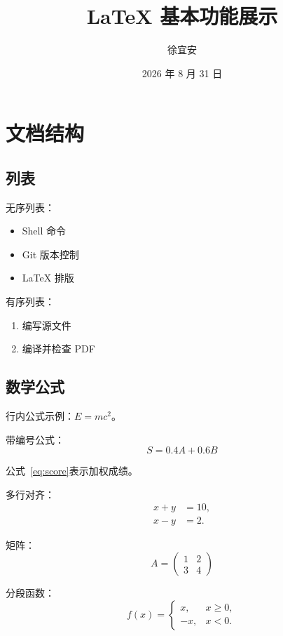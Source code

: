 \documentclass[10pt,a4paper,fontset=fandol]{ctexart}
\title{\vspace{-2em}LaTeX 基本功能展示}
\author{徐宜安\quad 25060012033}
\date{2026 年 8 月 31 日}
\begin{document}
\maketitle
\vspace{-2.5em}

\begin{minipage}[t]{0.48\textwidth}

\section{文档结构}

\subsection{列表}

无序列表：
\begin{itemize}
  \item Shell 命令
  \item Git 版本控制
  \item LaTeX 排版
\end{itemize}

有序列表：
\begin{enumerate}
  \item 编写源文件
  \item 编译并检查 PDF
\end{enumerate}

\subsection{数学公式}

行内公式示例：$E=mc^2$。

带编号公式：
\begin{equation}
  S = 0.4A + 0.6B
  \label{eq:score}
\end{equation}

公式~\eqref{eq:score}表示加权成绩。

多行对齐：
\begin{align}
  x+y &= 10,\\
  x-y &= 2.
\end{align}

矩阵：
\[
A=
\begin{pmatrix}
1 & 2\\
3 & 4
\end{pmatrix}
\]

分段函数：
\[
f(x)=
\begin{cases}
x, & x\ge 0,\\
-x, & x<0.
\end{cases}
\]

\end{minipage}
\end{document}

